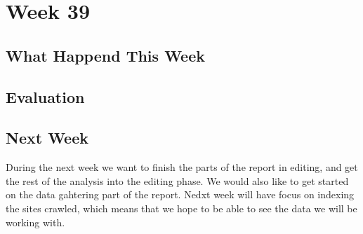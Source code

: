 \section*{Week 39}
\subsection*{What Happend This Week}

\subsection*{Evaluation}

\subsection*{Next Week}
During the next week we want to finish the parts of the report in editing, and
get the rest of the analysis into the editing phase. We would also like to get
started on the data gahtering part of the report. Nedxt week will have focus on
indexing the sites crawled, which means that we hope to be able to see
the data we will be working with.
